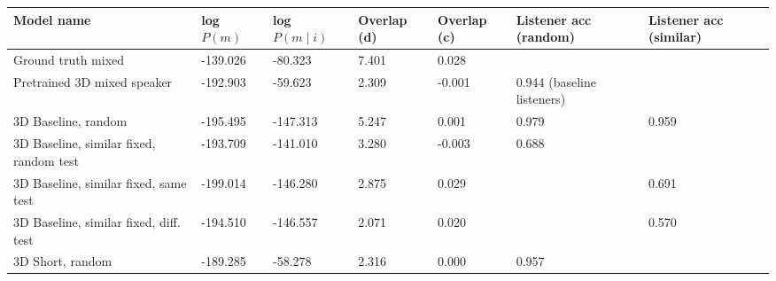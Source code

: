 \begin{table}[] 
	\begin{tabularx}{\textwidth}{|X|l|l|X|X|X|X|}
		\hline
		\textbf{Model name}                                    & \textbf{log $P(m)$} & \textbf{log $P(m \mid i)$} & \textbf{Overlap (d)} & \textbf{Overlap (c)} & \textbf{Listener acc (random)} & \textbf{Listener acc (similar)} \\ \hline
		Ground truth mixed       &     -139.026            &    -80.323             &       7.401        &        0.028        &                 &                \\ \hline
		Pretrained 3D mixed speaker    &      -192.903           &         -59.623               &        2.309              &      -0.001                & 0.944 (baseline listeners)                 &                 \\ \hline
		3D Baseline, random  &       -195.495        &           -147.313           &          5.247            &         0.001             & 0.979                                    &                        0.959                   \\ \hline
		3D Baseline, similar fixed, random test &       -193.709            &    -141.010                  &        3.280            &      -0.003         &            0.688       &                           \\ \hline
		3D Baseline, similar fixed, same test &      -199.014        &        -146.280           &        2.875       &      0.029   &              &          0.691                   \\ \hline
		3D Baseline, similar fixed, diff. test &     -194.510     &    -146.557          &   2.071      & 0.020    &                &              0.570          \\ \hline
		3D Short, random&      -189.285             &      -58.278                  &             2.316        &         0.000             &                   0.957                       &                                           \\ \hline

\end{tabularx}
\end{table}

